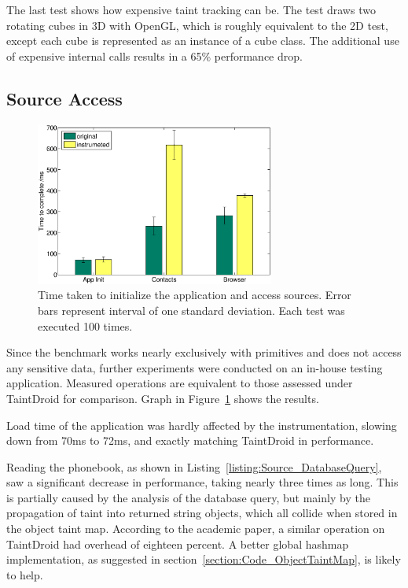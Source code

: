 \documentclass[12pt,twoside,notitlepage]{report}
\begin{document}
The last test shows how expensive taint tracking can be. The test draws two rotating cubes in 3D with OpenGL, which is roughly equivalent to the 2D test, except each cube is represented as an instance of a cube class. The additional use of expensive internal calls results in a 65\% performance drop.

\subsection{Source Access}

\begin{figure}
	\centerline{	
		\includegraphics[width=0.7\textwidth]{figs/fig_eval_testappbench.eps}
	}
	\caption{Time taken to initialize the application and access sources. Error bars represent interval of one standard deviation. Each test was executed 100 times.}
	\label{figure:Evalutaion_TestAppBench}
\end{figure}

Since the benchmark works nearly exclusively with primitives and does not access any sensitive data, further experiments were conducted on an in-house testing application. Measured operations are equivalent to those assessed under TaintDroid for comparison. Graph in Figure~\ref{figure:Evalutaion_TestAppBench} shows the results.

Load time of the application was hardly affected by the instrumentation, slowing down from 70ms to 72ms, and exactly matching TaintDroid in performance. 

Reading the phonebook, as shown in Listing~\ref{listing:Source_DatabaseQuery}, saw a significant decrease in performance, taking nearly three times as long. This is partially caused by the analysis of the database query, but mainly by the propagation of taint into returned string objects, which all collide when stored in the object taint map. According to the academic paper, a similar operation on TaintDroid had overhead of eighteen percent. A better global hashmap implementation, as suggested in section~\ref{section:Code_ObjectTaintMap}, is likely to help.
\end{document}
